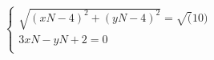 \documentclass[preview]{standalone}
\begin{document}
\begin{align*}
\begin{cases} \sqrt{(xN - 4)^2 + (yN - 4)^2} = \sqrt(10)  \\ 3xN - yN + 2 = 0 \\ \end{cases}
\end{align*}
\end{document}
